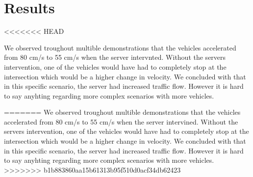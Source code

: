 \section{Results}
<<<<<<< HEAD

We observed troughout multible demonstrations that the vehicles accelerated from 80 cm/s to 55 cm/s when the server intervnted. Without the servers intervention, one of the vehicles would have had to completely stop at the intersection which would be a higher change in velocity. We concluded with that in this specific scenario, the server had increased traffic flow. However it is hard to say anyhting regarding more complex scenarios with more vehicles.



=======
We observed troughout multible demonstrations that the vehicles accelerated from 80 cm/s to 55 cm/s when the server intervined. Without the servers intervention, one of the vehicles would have had to completely stop at the intersection which would be a higher change in velocity. We concluded with that in this specific scenario, the server had increased traffic flow. However it is hard to say anyhting regarding more complex scenarios with more vehicles.
>>>>>>> b1b883860aa15b61313b95f510d0acf34db62423
